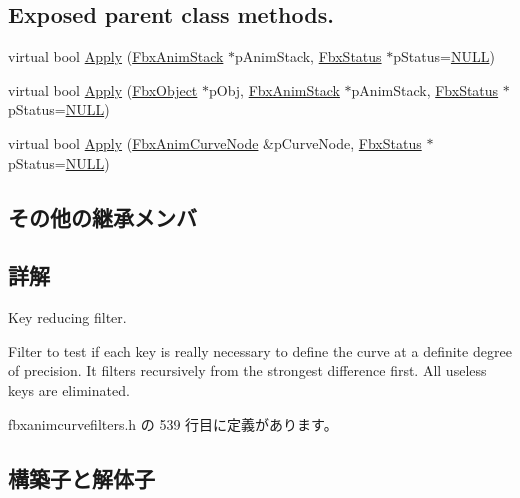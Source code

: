 \subsection*{Exposed parent class methods.}
\begin{DoxyCompactItemize}
\item 
virtual bool \hyperlink{class_fbx_anim_curve_filter_key_reducer_ace307ff2d9d99bf845ddaa26649fb136}{Apply} (\hyperlink{class_fbx_anim_stack}{Fbx\+Anim\+Stack} $\ast$p\+Anim\+Stack, \hyperlink{class_fbx_status}{Fbx\+Status} $\ast$p\+Status=\hyperlink{fbxarch_8h_a070d2ce7b6bb7e5c05602aa8c308d0c4}{N\+U\+LL})
\item 
virtual bool \hyperlink{class_fbx_anim_curve_filter_key_reducer_ac9cd8a32e87c1589d0f245be377a3da3}{Apply} (\hyperlink{class_fbx_object}{Fbx\+Object} $\ast$p\+Obj, \hyperlink{class_fbx_anim_stack}{Fbx\+Anim\+Stack} $\ast$p\+Anim\+Stack, \hyperlink{class_fbx_status}{Fbx\+Status} $\ast$p\+Status=\hyperlink{fbxarch_8h_a070d2ce7b6bb7e5c05602aa8c308d0c4}{N\+U\+LL})
\item 
virtual bool \hyperlink{class_fbx_anim_curve_filter_key_reducer_a1f3a0f984cf30eb74d9ae260ef9ae252}{Apply} (\hyperlink{class_fbx_anim_curve_node}{Fbx\+Anim\+Curve\+Node} \&p\+Curve\+Node, \hyperlink{class_fbx_status}{Fbx\+Status} $\ast$p\+Status=\hyperlink{fbxarch_8h_a070d2ce7b6bb7e5c05602aa8c308d0c4}{N\+U\+LL})
\end{DoxyCompactItemize}
\subsection*{その他の継承メンバ}


\subsection{詳解}
Key reducing filter.

Filter to test if each key is really necessary to define the curve at a definite degree of precision. It filters recursively from the strongest difference first. All useless keys are eliminated. 

 fbxanimcurvefilters.\+h の 539 行目に定義があります。



\subsection{構築子と解体子}
\mbox{\label{class_fbx_anim_curve_filter_key_reducer_ad43e77bed0728ae7cd9f24e33753f984}} 
